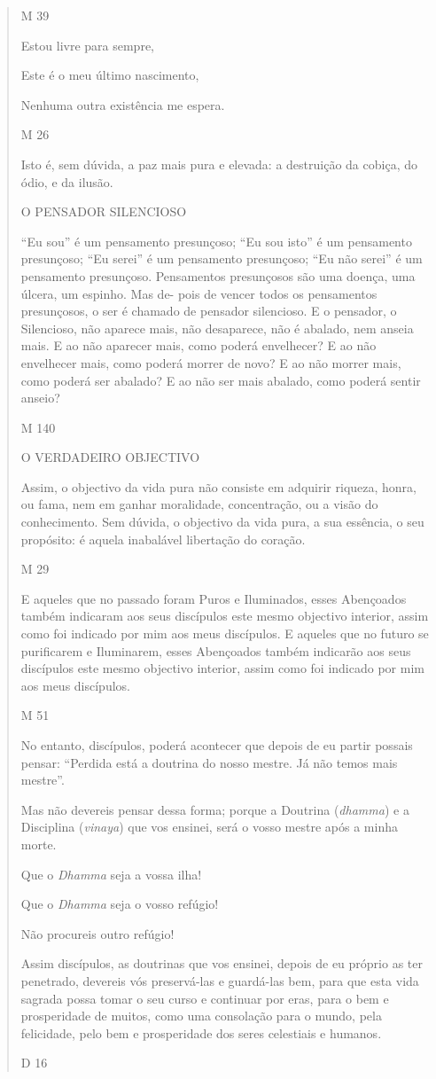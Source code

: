 \begin{quote}
M 39

Estou livre para sempre,

Este é o meu último nascimento,

Nenhuma outra existência me espera.

M 26

Isto é, sem dúvida, a paz mais pura e elevada: a destruição da cobiça, do ódio, e da ilusão.

O PENSADOR SILENCIOSO

``Eu sou'' é um pensamento presunçoso; ``Eu sou isto'' é um pensamento presunçoso; ``Eu serei'' é um pensamento presunçoso; ``Eu não serei'' é um pensamento presunçoso. Pensamentos presunçosos são uma doença, uma úlcera, um espinho. Mas de- pois de vencer todos os pensamentos presunçosos, o ser é chamado de pensador silencioso. E o pensador, o Silencioso, não aparece mais, não desaparece, não é abalado, nem anseia mais. E ao não aparecer mais, como poderá envelhecer? E ao não envelhecer mais, como poderá morrer de novo? E ao não morrer mais, como poderá ser abalado? E ao não ser mais abalado, como poderá sentir anseio?

M 140

O VERDADEIRO OBJECTIVO

Assim, o objectivo da vida pura não consiste em adquirir riqueza, honra, ou fama, nem em ganhar moralidade, concentração, ou a visão do conhecimento. Sem dúvida, o objectivo da vida pura, a sua essência, o seu propósito: é aquela inabalável libertação do coração.

M 29

E aqueles que no passado foram Puros e Iluminados, esses Abençoados também indicaram aos seus discípulos este mesmo objectivo interior, assim como foi indicado por mim aos meus discípulos. E aqueles que no futuro se purificarem e Iluminarem, esses Abençoados também indicarão aos seus discípulos este mesmo objectivo interior, assim como foi indicado por mim aos meus discípulos.

M 51

No entanto, discípulos, poderá acontecer que depois de eu partir possais pensar: ``Perdida está a doutrina do nosso mestre. Já não temos mais mestre''.

Mas não devereis pensar dessa forma; porque a Doutrina (\emph{dhamma}) e a Disciplina (\emph{vinaya}) que vos ensinei, será o vosso mestre após a minha morte.

Que o \emph{Dhamma} seja a vossa ilha!

Que o \emph{Dhamma} seja o vosso refúgio!

Não procureis outro refúgio!

Assim discípulos, as doutrinas que vos ensinei, depois de eu próprio as ter penetrado, devereis vós preservá-las e guardá-las bem, para que esta vida sagrada possa tomar o seu curso e continuar por eras, para o bem e prosperidade de muitos, como uma consolação para o mundo, pela felicidade, pelo bem e prosperidade dos seres celestiais e humanos.

D 16
\end{quote}
